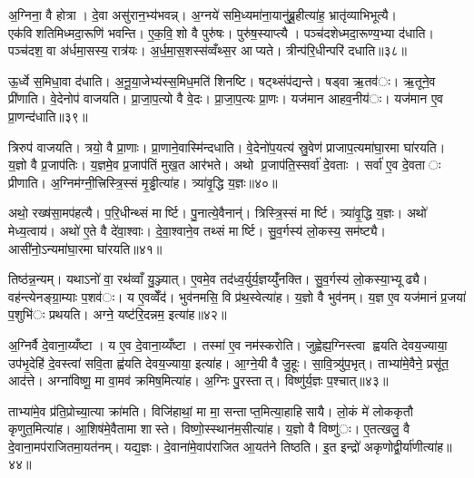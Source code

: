 
अ॒ग्निना॒ वै होत्रा। दे॒वा असु॑रान॒भ्य॑भवन्न्। अ॒ग्नये॑ समि॒ध्यमा॑ना॒यानु॑ब्रू॒हीत्या॑ह॒ भ्रातृ॑व्याभिभूत्यै। एक॑विशतिमिध्मदा॒रूणि॑ भवन्ति। ए॒क॒वि॒शो वै पुरु॑षः। पुरु॑ष॒स्याप्त्यै। पञ्च॑दशेध्मदा॒रूण्य॒भ्या द॑धाति। पञ्च॑दश॒ वा अ॑र्धमा॒सस्य॒ रात्र॑यः। अ॒र्ध॒मा॒स॒शस्स॑व्वँथ्स॒र आप्यते। त्रीन्प॑रि॒धीन्परि॑ दधाति॥३८॥

ऊ॒र्ध्वे स॒मिधा॒वा द॑धाति। अ॒नू॒या॒जेभ्य॑स्स॒मिध॒मति॑ शिनष्टि। षट्थ्संप॑द्यन्ते। षड्वा ऋ॒तव॑ः। ऋ॒तूने॒व प्री॑णाति। वे॒देनोप॑ वाजयति। प्रा॒जा॒प॒त्यो वै वे॒दः। प्रा॒जा॒प॒त्यः प्रा॒णः। यज॑मान आहव॒नीय॑ः। यज॑मान ए॒व प्रा॒णन्द॑धाति॥३९॥

त्रिरुप॑ वाजयति। त्रयो॒ वै प्रा॒णाः। प्रा॒णाने॒वास्मि॑न्दधाति। वे॒देनो॑प॒यत्य॑ स्रु॒वेण॑ प्राजाप॒त्यमा॑घा॒रमा घा॑रयति। य॒ज्ञो वै प्र॒जाप॑तिः। य॒ज्ञमे॒व प्र॒जाप॑तिं मुख॒त आर॑भते। अथो प्र॒जाप॑ति॒स्सर्वा॑ दे॒वताः। सर्वा॑ ए॒व दे॒वताः प्रीणाति। अ॒ग्निम॑ग्नी॒त्त्रिस्त्रि॒स्सं मृ॒ड्ढीत्या॑ह। त्र्या॑वृ॒द्धि य॒ज्ञः॥४०॥

अथो॒ रख्ष॑सा॒मप॑हत्यै। प॒रि॒धीन्थ्सं मार्ष्टि। पु॒नात्ये॒वैनान्॑। त्रिस्त्रि॒स्सं मार्ष्टि। त्र्या॑वृ॒द्धि य॒ज्ञः। अथो॑ मेध्य॒त्वाय॑। अथो॑ ए॒ते वै दे॑वा॒श्वाः। दे॒वा॒श्वाने॒व तथ्सं मार्ष्टि। सु॒व॒र्गस्य॑ लो॒कस्य॒ सम॑ष्ट्यै। आसी॑नो॒ऽन्यमा॑घा॒रमा घा॑रयति॥४१॥

तिष्ठ॑न्न॒न्यम्। यथाऽनो॑ वा॒ रथ॑व्वाँ यु॒ञ्ज्यात्। ए॒वमे॒व तद॑ध्व॒र्युर्य॒ज्ञय्युँ॑नक्ति। सु॒व॒र्गस्य॑ लो॒कस्या॒भ्यूढ्यै। वह॑न्त्येनङ्ग्रा॒म्याः प॒शव॑ः। य ए॒वव्वेँद॑। भुव॑नमसि॒ वि प्र॑थ॒स्वेत्या॑ह। य॒ज्ञो वै भुव॑नम्। य॒ज्ञ ए॒व यज॑मानं प्र॒जया॑ प॒शुभि॑ः प्रथयति। अग्ने॒ यष्ट॑रि॒दन्नम॒ इत्या॑ह॥४२॥

अ॒ग्निर्वै दे॒वाना॒य्यँष्टा। य ए॒व दे॒वाना॒य्यँष्टा। तस्मा॑ ए॒व नम॑स्करोति। जुह्वेह्य॒ग्निस्त्वा ह्वयति देवय॒ज्याया॒ उप॑भृ॒देहि॑ दे॒वस्त्वा॑ सवि॒ता ह्व॑यति देवय॒ज्याया॒ इत्या॑ह। आ॒ग्ने॒यी वै जु॒हूः। सा॒वि॒त्र्यु॑प॒भृत्। ताभ्या॑मे॒वैने॒ प्रसू॑त॒ आद॑त्ते। अग्ना॑विष्णू॒ मा वा॒मव॑ क्रमिष॒मित्या॑ह। अ॒ग्निः पु॒रस्तात्। विष्णु॑र्य॒ज्ञः प॒श्चात्॥४३॥

ताभ्या॑मे॒व प्र॑ति॒प्रोच्या॒त्या क्रा॑मति। विजि॑हाथां॒ मा मा॒ सन्ताप्त॒मित्या॒हाहिसायै। लो॒कं मे॑ लोककृतौ कृणुत॒मित्या॑ह। आ॒शिष॑मे॒वैतामा शास्ते। विष्णो॒स्स्थान॑म॒सीत्या॑ह। य॒ज्ञो वै विष्णु॑ः। ए॒तत्खलु॒ वै दे॒वाना॒मप॑राजितमा॒यत॑नम्। यद्य॒ज्ञः। दे॒वाना॑मे॒वाप॑राजित आ॒यत॑ने तिष्ठति। इ॒त इन्द्रो॑ अकृणोद्वी॒र्या॑णीत्या॑ह॥४४॥

